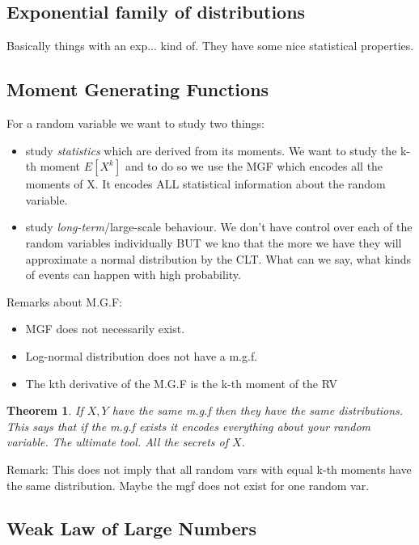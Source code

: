 \documentclass{article}
\newtheorem{theorem}{Theorem}
\begin{document}
\subsection{Exponential family of distributions}
Basically things with an exp... kind of. They have some nice statistical properties.


\subsection{Moment Generating Functions}
For a random variable we want to study two things: 

\begin{itemize}
\item  study \textit{statistics} which are derived from its moments. We want to study the k-th moment $E[X^k]$ and to do so we use the MGF which encodes all the moments of X. It encodes ALL statistical information about the random variable. 
\item study \textit{long-term}/large-scale behaviour. We don't have control over each of the random variables individually BUT we kno that the more we have they will approximate a normal distribution by the CLT. What can we say, what kinds of events can happen with high probability. 
\end{itemize}

Remarks about M.G.F:
\begin{itemize}
\item MGF does not necessarily exist. 
\item Log-normal distribution does not have a m.g.f.
\item The kth derivative of the M.G.F is the k-th moment of the RV
\end{itemize}

\begin{theorem}
If $X, Y$ have the same m.g.f then they have the same distributions. This says that if the m.g.f exists it encodes everything about your random variable. The ultimate tool. All the secrets of $X$.
\end{theorem}

Remark: This does not imply that all random vars with equal k-th moments have the same distribution. Maybe the mgf does not exist for one random var. 

\subsection{Weak Law of Large Numbers}
\end{document}
